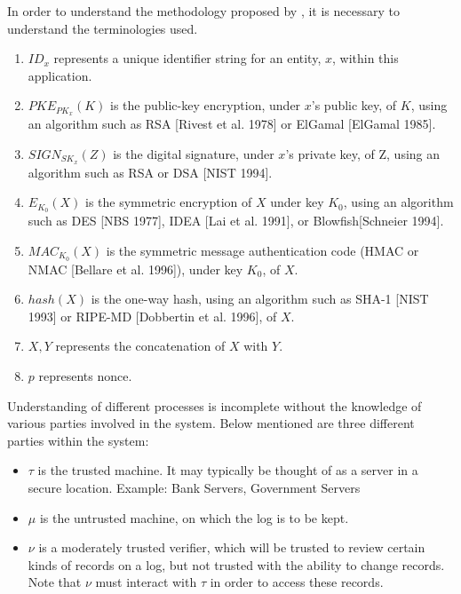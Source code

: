 \documentclass[12pt, letter]{article}
\newcommand\paperAuthors[2]{[#1 and #2]}
\newcommand\makePaperAuthors{\paperAuthors{Bruce Schneier}{John Kelsey}}
\begin{document}
In order to understand the methodology proposed by \text{\makePaperAuthors}, it is necessary to understand the terminologies used.
\renewcommand{\labelenumi}{(\roman{enumi})}
\begin{enumerate}
    \item $ID_x$ represents a unique identifier string for an entity, $x$, within this application. 
    
    \item $PKE_{PK_x} (K)$ is the public-key encryption, under $x$’s public key, of $K$, using an algorithm such as RSA [Rivest et al. 1978] or ElGamal [ElGamal 1985].

    \item $SIGN_{SK_x}(Z)$ is the digital signature, under $x$’s private key, of Z, using an algorithm such as RSA or DSA [NIST 1994].

    \item $E_{K_0}(X)$ is the symmetric encryption of $X$ under key $K_0$, using an algorithm such as DES [NBS 1977], IDEA [Lai et al. 1991], or Blowfish[Schneier 1994]. 

    \item $MAC_{K_0}(X)$ is the symmetric message authentication code (HMAC or NMAC [Bellare et al. 1996]), under key $K_0$, of $X$. 

    \item $hash(X)$ is the one-way hash, using an algorithm such as SHA-1 [NIST 1993] or RIPE-MD [Dobbertin et al. 1996], of $X$. 

    \item $X, Y$ represents the concatenation of $X$ with $Y$. 

    \item $p$ represents nonce.
\end{enumerate}

Understanding of different processes is incomplete without the knowledge of various parties involved in the system. Below mentioned are three different parties within the system:

\begin{itemize}
    \item $\tau$ is the trusted machine. It may typically be thought of as a server in a secure location. Example: Bank Servers, Government Servers
    
    \item $\mu$ is the untrusted machine, on which the log is to be kept.
    
    \item $\nu$ is a moderately trusted verifier, which will be trusted to review certain kinds of records on a log, but not trusted with the ability to change records. Note that $\nu$ must interact with $\tau$ in order to access these records. 
\end{itemize}
\end{document}
